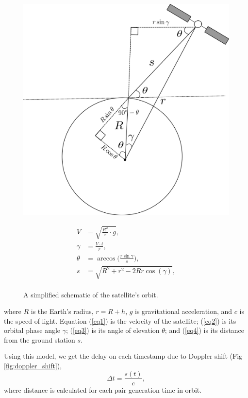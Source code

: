\begin{figure}[ht!]
	\begin{minipage}{.5\textwidth}
	\centering
	\includegraphics[width=0.75\linewidth]{assets/orbit.png}
	\label{fig:orbit}
	\end{minipage}%
	\begin{minipage}{.5\textwidth}
		\begin{align}
		V &= \sqrt{\frac{R^2}{r} \cdot g}, \label{eq1} \\
		\gamma &= \frac{V \cdot t}{r}, \label{eq2} \\
		\theta &= \arccos\Big(\frac{r\sin\gamma}{s}\Big), \label{eq3} \\
		s &= \sqrt{R^2 + r^2 - 2Rr\cos(\gamma)}, \label{eq4}\\
		\end{align}
	\end{minipage}
	\caption{A simplified schematic of the satellite's orbit.}
\end{figure}

\noindent where $R$ is the Earth's radius, $r = R + h$, $g$ is gravitational acceleration, and $c$ is the speed of light. Equation (\ref{eq1}) is the velocity of the satellite; (\ref{eq2}) is its orbital phase angle $\gamma$; (\ref{eq3}) is its angle of elevation $\theta$; and (\ref{eq4}) is its distance from the ground station $s$.

Using this model, we get the delay on each timestamp due to Doppler shift (Fig \ref{fig:doppler_shift}),
\begin{equation}
\Delta t = \frac{s(t)}{c}, \label{eq6}
\end{equation}
where distance is calculated for each pair generation time in orbit. 

